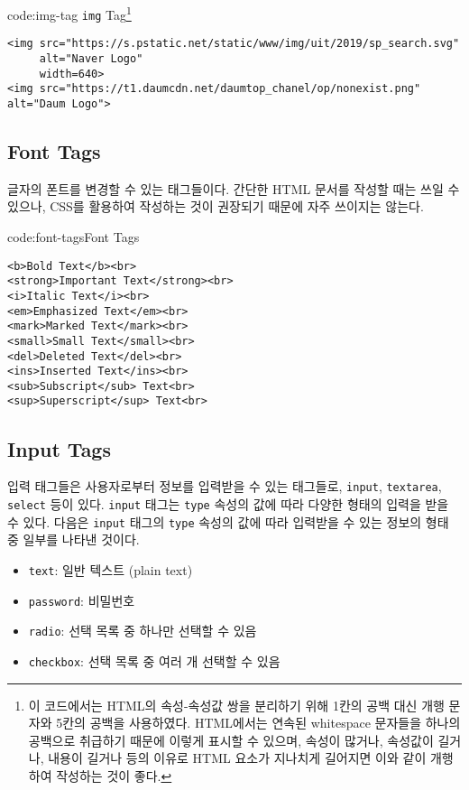 \begin{codeenv}{code:img-tag}
    {\texttt{img} Tag\footnote{이 코드에서는 HTML의 속성-속성값 쌍을 분리하기 위해 1칸의 공백 대신 개행 문자와 5칸의 공백을 사용하였다. HTML에서는 연속된 whitespace 문자들을 하나의 공백으로 취급하기 때문에 이렇게 표시할 수 있으며, 속성이 많거나, 속성값이 길거나, 내용이 길거나 등의 이유로 HTML 요소가 지나치게 길어지면 이와 같이 개행하여 작성하는 것이 좋다.}}
    \begin{verbatim}
<img src="https://s.pstatic.net/static/www/img/uit/2019/sp_search.svg"
     alt="Naver Logo"
     width=640>
<img src="https://t1.daumcdn.net/daumtop_chanel/op/nonexist.png" alt="Daum Logo">
\end{verbatim}
\end{codeenv}

\subsection*{Font Tags}
글자의 폰트를 변경할 수 있는 태그들이다. 간단한 HTML 문서를 작성할 때는 쓰일 수 있으나, CSS를 활용하여 작성하는 것이 권장되기 때문에 자주 쓰이지는 않는다. 

\begin{codeenv}{code:font-tags}{Font Tags}\begin{verbatim}
<b>Bold Text</b><br>
<strong>Important Text</strong><br>
<i>Italic Text</i><br>
<em>Emphasized Text</em><br>
<mark>Marked Text</mark><br>
<small>Small Text</small><br>
<del>Deleted Text</del><br>
<ins>Inserted Text</ins><br>
<sub>Subscript</sub> Text<br>
<sup>Superscript</sup> Text<br>
\end{verbatim}
\end{codeenv}

\subsection*{Input Tags}
입력 태그들은 사용자로부터 정보를 입력받을 수 있는 태그들로, \texttt{input}, \texttt{textarea}, \texttt{select} 등이 있다. \texttt{input} 태그는 \texttt{type} 속성의 값에 따라 다양한 형태의 입력을 받을 수 있다. 다음은 \texttt{input} 태그의 \texttt{type} 속성의 값에 따라 입력받을 수 있는 정보의 형태 중 일부를 나타낸 것이다.

\begin{itemize}
    \item \texttt{text}: 일반 텍스트 (plain text)
    \item \texttt{password}: 비밀번호
    \item \texttt{radio}: 선택 목록 중 하나만 선택할 수 있음
    \item \texttt{checkbox}: 선택 목록 중 여러 개 선택할 수 있음
\end{itemize}

